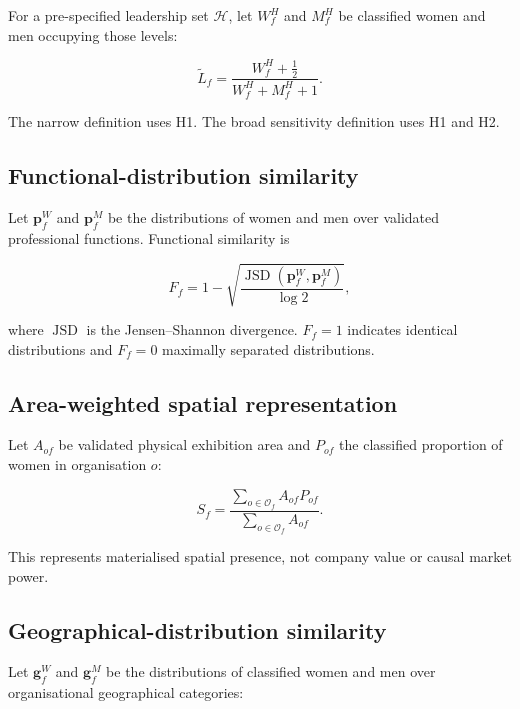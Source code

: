 For a pre-specified leadership set $\mathcal{H}$, let $W_f^{H}$ and $M_f^{H}$
be classified women and men occupying those levels:

\begin{equation}
\widetilde{L}_{f}
=
\frac{
W_f^{H}+\frac{1}{2}
}{
W_f^{H}+M_f^{H}+1
}.
\end{equation}

The narrow definition uses H1. The broad sensitivity definition uses H1 and
H2.

\subsection{Functional-distribution similarity}

Let $\mathbf{p}_{f}^{W}$ and $\mathbf{p}_{f}^{M}$ be the distributions of
women and men over validated professional functions. Functional similarity is

\begin{equation}
F_f
=
1-
\sqrt{
\frac{
\operatorname{JSD}
\left(
\mathbf{p}_{f}^{W},
\mathbf{p}_{f}^{M}
\right)
}{
\log 2
}
},
\end{equation}

where $\operatorname{JSD}$ is the Jensen--Shannon divergence. $F_f=1$
indicates identical distributions and $F_f=0$ maximally separated
distributions.

\subsection{Area-weighted spatial representation}

Let $A_{of}$ be validated physical exhibition area and $P_{of}$ the classified
proportion of women in organisation $o$:

\begin{equation}
S_f
=
\frac{
\sum_{o \in \mathcal{O}_{f}} A_{of}P_{of}
}{
\sum_{o \in \mathcal{O}_{f}} A_{of}
}.
\end{equation}

This represents materialised spatial presence, not company value or causal
market power.

\subsection{Geographical-distribution similarity}

Let $\mathbf{g}_{f}^{W}$ and $\mathbf{g}_{f}^{M}$ be the distributions of
classified women and men over organisational geographical categories:

